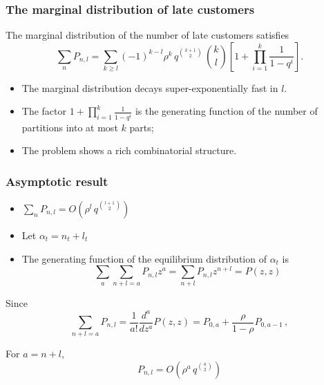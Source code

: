 \documentclass[table,aspectratio=169]{beamer}
\begin{document}
\begin{frame}[t]\frametitle{The marginal distribution of late customers}
    \begin{theorem}[Lancia et al, 2017]
        The marginal distribution of the number of late customers satisfies
        \begin{equation*}
            \sum_n P_{n,l}= \sum_{k\geq l} (-1)^{k-l}\rho^k\,q^{\binom{k+1}{2}} \,\binom{k}{l} \left[1+\prod_{i=1}^k\frac{1}{1-q^i}\right].
        \end{equation*}
    \end{theorem}
    \begin{itemize}
        \item The marginal distribution decays super-exponentially fast in $l$.
        \item The factor $1+\prod_{i=1}^k\frac{1}{1-q^i}$ is the
        generating function of the number of partitions into at most $k$
        parts;
        \item The problem shows a rich combinatorial structure.
    \end{itemize}
\end{frame}

\begin{frame}[t]\frametitle{Asymptotic result}
    \begin{itemize}
        \item $\sum_n P_{n,l} = O(\rho^l\,q^{\binom{l+1}{2}})$
        \item Let $\alpha_t = n_t + l_t$
        \item The generating function of the equilibrium distribution of $\alpha_t$ is
        \[\sum_{a} \sum_{n+l=a} P_{n,l} z^{a} = \sum_{n+l} P_{n,l} z^{n+l} = P(z,z)\]
    \end{itemize}
    Since
    \[\sum_{n+l=a} P_{n,l} = \frac{1}{a!} \frac{d^a}{dz^a}P(z,z) = P_{0,a} + \frac{\rho}{1-\rho}P_{0,a-1}\,,\]
    \begin{theorem}[Lancia et al, 2017]
        For $a = n+l$,
        \[P_{n,l} = O(\rho^a\,q^{\binom{a}{2}})\]
    \end{theorem}
\end{frame}
\end{document}
